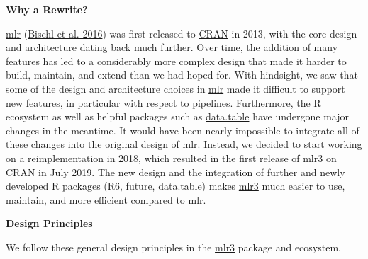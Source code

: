 \documentclass[
]{scrbook}
\begin{document}
\textbf{Why a Rewrite?}

\href{https://mlr.mlr-org.com}{mlr} (\protect\hyperlink{ref-mlr}{Bischl et al. 2016}) was first released to \href{https://cran.r-project.org}{CRAN} in 2013, with the core design and architecture dating back much further.
Over time, the addition of many features has led to a considerably more complex design that made it harder to build, maintain, and extend than we had hoped for.
With hindsight, we saw that some of the design and architecture choices in \href{https://mlr.mlr-org.com}{mlr} made it difficult to support new features, in particular with respect to pipelines.
Furthermore, the R ecosystem as well as helpful packages such as \href{https://cran.r-project.org/package=data.table}{data.table} have undergone major changes in the meantime.
It would have been nearly impossible to integrate all of these changes into the original design of \href{https://mlr.mlr-org.com}{mlr}.
Instead, we decided to start working on a reimplementation in 2018, which resulted in the first release of \href{https://mlr3.mlr-org.com}{mlr3} on CRAN in July 2019.
The new design and the integration of further and newly developed R packages (R6, future, data.table) makes \href{https://mlr3.mlr-org.com}{mlr3} much easier to use, maintain, and more efficient compared to \href{https://mlr.mlr-org.com}{mlr}.

\textbf{Design Principles}

We follow these general design principles in the \href{https://mlr3.mlr-org.com}{mlr3} package and ecosystem.
\end{document}
